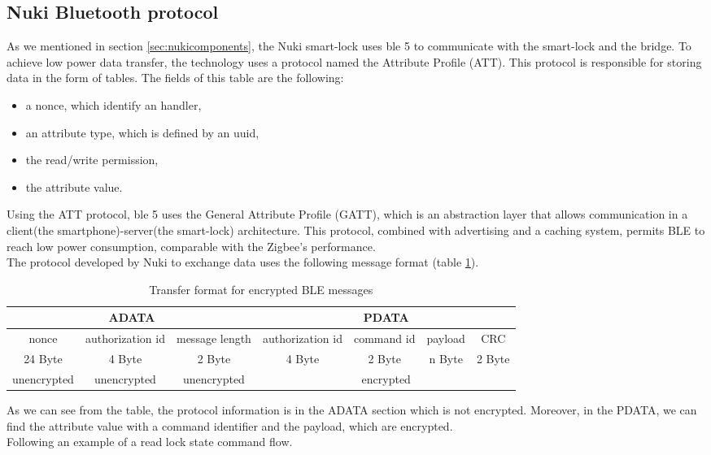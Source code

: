\subsection{Nuki Bluetooth protocol}
As we mentioned in section \ref{sec:nukicomponents}, the Nuki smart-lock uses \acrshort{ble} 5 to communicate with the smart-lock and the bridge. To achieve low power data transfer, the technology uses a protocol named the Attribute Profile (ATT)\cite{s21113812}. This protocol is responsible for storing data in the form of tables. The fields of this table are the following:
\begin{itemize}
    \item a nonce, which identify an handler,
    \item an attribute type, which is defined by an \gls{uuid},
    \item the read/write permission,
    \item the attribute value.
\end{itemize}
Using the ATT protocol, \acrshort{ble} 5 uses the General Attribute Profile (GATT), which is an abstraction layer that allows communication in a client(the smartphone)-server(the smart-lock) architecture. This protocol, combined with advertising and a caching system, permits BLE to reach low power consumption, comparable with the Zigbee's performance.
\\ The protocol developed by Nuki to exchange data uses the following message format (table \ref{tab:encr-messages}). 

\begin{table}[ht]
    \footnotesize
    \centering
    \begin{tabular}{|c|c|c|c|c|c|c|}
        \hline \multicolumn{3}{|c|}{ ADATA } & \multicolumn{4}{c|}{ PDATA } \\
        \hline nonce & authorization id & message length & authorization id & command id & payload & CRC \\
        \hline 24 Byte & 4 Byte & 2 Byte & 4 Byte & 2 Byte & n Byte & 2 Byte \\
        \hline unencrypted & unencrypted & unencrypted & \multicolumn{4}{|c|}{ encrypted } \\
        \hline
    \end{tabular}
    \caption{Transfer format for encrypted BLE messages}
    \label{tab:encr-messages}
\end{table}

As we can see from the table, the protocol information is in the ADATA section which is not encrypted. Moreover, in the PDATA, we can find the attribute value with a command identifier and the payload, which are encrypted. \\
Following an example of a read lock state command flow.

